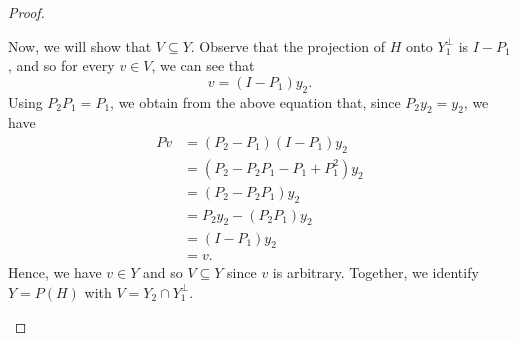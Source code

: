 \begin{proof}
\begin{enumerate}
        Now, we will show that \( V \subseteq Y  \). Observe that the projection of \( H  \) onto \( {Y}_{1}^{\perp}  \) is \( I - {P}_{1} \), and so for every \( v \in V  \), we can see that 
        \[  v = (I - {P}_{1}){y}_{2}. \]
        Using \( {P}_{2} {P}_{1} = {P}_{1} \), we obtain from the above equation that, since \( {P}_{2} {y}_{2} = {y}_{2} \), we have 
        \begin{align*}
            Pv &= ({P}_{2} - {P}_{1}) (I - {P}_{1}){y}_{2}  \\
               &= ({P}_{2} - {P}_{2} {P}_{1} - {P}_{1} + {P}_{1}^{2}) {y}_{2} \\
               &= ({P}_{2} - {P}_{2}{P}_{1}){y}_{2} \\
               &= {P}_{2}{y}_{2} - ({P}_{2} {P}_{1}){y}_{2} \\
               &= (I - {P}_{1}){y}_{2} \\
               &= v.
        \end{align*}
        Hence, we have \( v \in Y  \) and so \( V \subseteq Y  \) since \( v  \) is arbitrary. Together, we identify \( Y = P(H) \) with \( V = {Y}_{2} \cap {Y}_{1}^{\perp} \).
\end{enumerate}
\end{proof}


